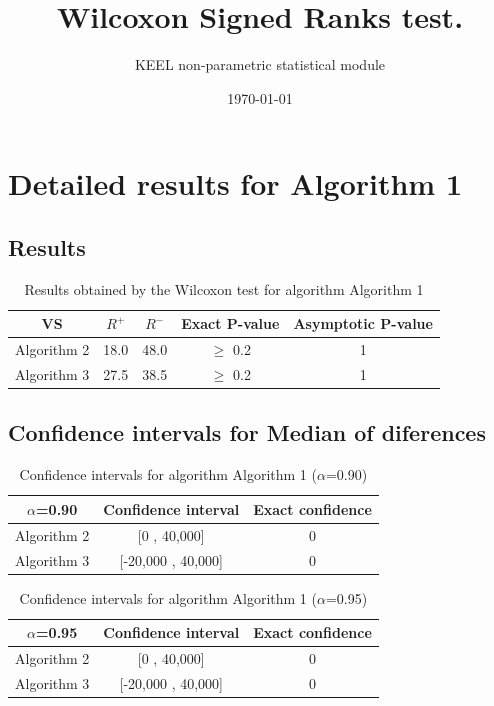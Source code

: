 \documentclass[a4paper,10pt]{article}
\title{Wilcoxon Signed Ranks test.}
\date{\today}
\author{KEEL non-parametric statistical module}
\begin{document}
\pagestyle{empty}
\maketitle
\thispagestyle{empty}



\section{Detailed results for Algorithm 1}


\subsection{Results}

\begin{table}[!htp]
\centering\small
\begin{tabular}{
|c|c|c|c|c|}
\hline
 VS & $R^{+}$ & $R^{-}$ & Exact P-value & Asymptotic P-value \\ \hline 
Algorithm 2 & 18.0 & 48.0 & $\geq$ 0.2 & 1\\ \hline 
Algorithm 3 & 27.5 & 38.5 & $\geq$ 0.2 & 1\\ \hline 

\end{tabular}
\caption{Results obtained by the Wilcoxon test for algorithm Algorithm 1}
\end{table}

\subsection{Confidence intervals for Median of diferences}

\begin{table}[!htp]
\centering\small
\begin{tabular}{
|c|c|c|}
\hline
 $\alpha$=0.90 & Confidence interval & Exact confidence \\ \hline 
Algorithm 2 & [0 , 40,000] & 0\\ \hline 
Algorithm 3 & [-20,000 , 40,000] & 0\\ \hline 

\end{tabular}
\caption{Confidence intervals for algorithm Algorithm 1 ($\alpha$=0.90)}
\end{table}
\begin{table}[!htp]
\centering\small
\begin{tabular}{
|c|c|c|}
\hline
 $\alpha$=0.95 & Confidence interval & Exact confidence \\ \hline 
Algorithm 2 & [0 , 40,000] & 0\\ \hline 
Algorithm 3 & [-20,000 , 40,000] & 0\\ \hline 

\end{tabular}
\caption{Confidence intervals for algorithm Algorithm 1 ($\alpha$=0.95)}
\end{table}
\end{document}
